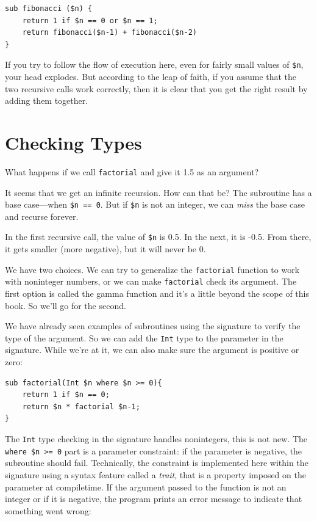 \begin{verbatim}
sub fibonacci ($n) {
    return 1 if $n == 0 or $n == 1;
    return fibonacci($n-1) + fibonacci($n-2)
}
\end{verbatim}
%
If you try to follow the flow of execution here, even for fairly
small values of \verb'$n', your head explodes.  But according to the
leap of faith, if you assume that the two recursive calls
work correctly, then it is clear that you get
the right result by adding them together.


\section{Checking Types}
\label{guardian}

What happens if we call {\tt factorial} and give it 1.5 as an argument?

It seems that we get an infinite recursion.  How can that be? 
The subroutine has a base case---when {\tt \$n == 0}.  But if {\tt \$n} 
is not an integer, we can {\em miss} the base case and recurse forever.

In the first recursive call, the value of {\tt \$n} is 0.5.
In the next, it is -0.5.  From there, it gets smaller
(more negative), but it will never be 0.

We have two choices.  We can try to generalize the {\tt factorial}
function to work with noninteger numbers, or we can make 
{\tt factorial} check its argument.  The first option is 
called the gamma function and it's a little beyond the scope 
of this book.  So we'll go for the second.

We have already seen examples of subroutines using the signature 
to verify the type of the argument. So we can add the {\tt Int} 
type to the parameter in the signature. While we're at it, 
we can also make sure the argument is positive or zero:

\begin{verbatim}
sub factorial(Int $n where $n >= 0){
    return 1 if $n == 0;
    return $n * factorial $n-1;
}
\end{verbatim}
%
The {\tt Int} type checking in the signature handles 
nonintegers, this is not new. The {\tt where \$n >= 0} 
part is a parameter constraint: if the parameter is negative, 
the subroutine should fail.  Technically, the constraint is 
implemented here within the signature using a syntax feature 
called a \emph{trait}, that is a property imposed on the 
parameter at compiletime. If the argument passed to the 
function is not an integer or if it is negative, the program prints
an error message to indicate that something went wrong:

